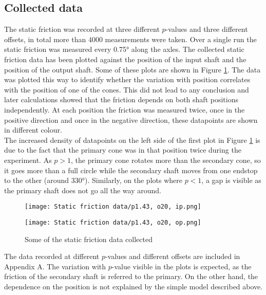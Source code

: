 \documentclass[12pt]{article}
\begin{document}
\subsection{Collected data}
The static friction was recorded at three different $p$-values and three different offsets, in total more than 4000 measurements were taken. Over a single run the static friction was measured every 0.75° along the axles. The collected static friction data has been plotted against the position of the input shaft and the position of the output shaft. Some of these plots are shown in Figure \ref{fig:staticFrictionData}. The data was plotted this way to identify whether the variation with position correlates with the position of one of the cones. This did not lead to any conclusion and later calculations showed that the friction depends on both shaft positions independently. At each position the friction was measured twice, once in the positive direction and once in the negative direction, these datapoints are shown in different colour.\\

The increased density of datapoints on the left side of the first plot in Figure \ref{fig:staticFrictionData} is due to the fact that the primary cone was in that position twice during the experiment. As $p>1$, the primary cone rotates more than the secondary cone, so it goes more than a full circle while the secondary shaft moves from one endstop to the other (around 330°). Similarly, on the plots where $p<1$, a gap is visible as the primary shaft does not go all the way around.
 
\begin{figure}[!h]
\label{fig:staticFrictionData}
    \centering
    \begin{minipage}{0.49\textwidth}       
         \texttt{[image: Static friction data/p1.43, o20, ip.png]}
    \end{minipage}
    \begin{minipage}{0.49\textwidth}       
         \texttt{[image: Static friction data/p1.43, o20, op.png]}
    \end{minipage}
\caption{Some of the static friction data collected}
\end{figure}



The data recorded at different $p$-values and different offsets are included in Appendix A.
The variation with $p$-value visible in the plots is expected, as the friction of the secondary shaft is referred to the primary. On the other hand, the dependence on the position is not explained by the simple model described above.
\end{document}
